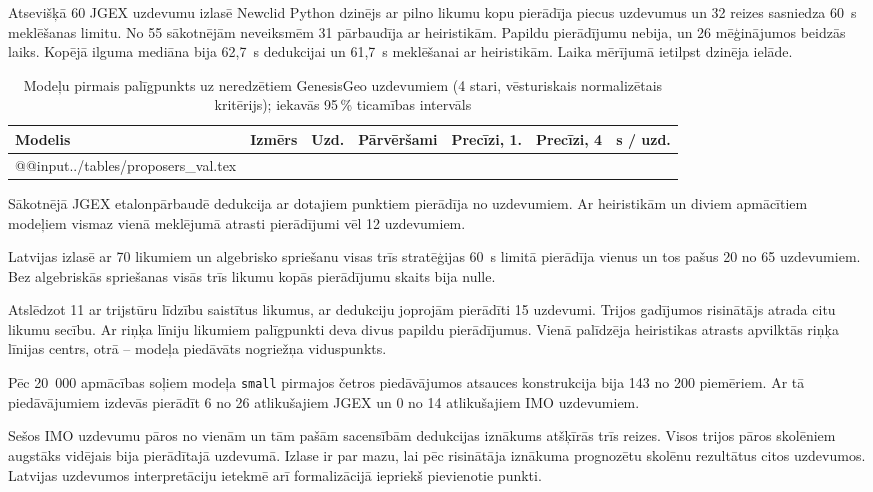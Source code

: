 \documentclass[nolabels]{../template/zpd}
\begin{document}
Atsevišķā 60 JGEX uzdevumu izlasē Newclid Python dzinējs ar pilno likumu kopu pierādīja piecus uzdevumus un 32 reizes sasniedza 60~s meklēšanas limitu. No 55 sākotnējām neveiksmēm 31 pārbaudīja ar heiristikām. Papildu pierādījumu nebija, un 26 mēģinājumos beidzās laiks. Kopējā ilguma mediāna bija 62,7~s dedukcijai un 61,7~s meklēšanai ar heiristikām. Laika mērījumā ietilpst dzinēja ielāde.

\begin{table}[H]
  \caption{Modeļu pirmais palīgpunkts uz neredzētiem GenesisGeo uzdevumiem (4 stari, vēsturiskais normalizētais kritērijs); iekavās 95\,\% ticamības intervāls}\label{tab:proposers}
  \centering\small
  \begin{tabular}{@{}lcccccc@{}}
    \toprule
    Modelis & Izmērs & Uzd. & Pārvēršami & Precīzi, 1. & Precīzi, 4 & s / uzd. \\
    \midrule
    \csname @@input\endcsname ../tables/proposers_val.tex 
    \bottomrule
  \end{tabular}
\end{table}



\begin{secinajumi}
  \item Sākotnējā JGEX etalonpārbaudē dedukcija ar dotajiem punktiem pierādīja \jgexSolved{} no \jgexTotal{} uzdevumiem. Ar heiristikām un diviem apmācītiem modeļiem vismaz vienā meklējumā atrasti pierādījumi vēl 12 uzdevumiem.
  \item Latvijas izlasē ar 70 likumiem un algebrisko spriešanu visas trīs stratēģijas 60~s limitā pierādīja vienus un tos pašus 20 no 65 uzdevumiem. Bez algebriskās spriešanas visās trīs likumu kopās pierādījumu skaits bija nulle.
  \item Atslēdzot 11 ar trijstūru līdzību saistītus likumus, ar dedukciju joprojām pierādīti 15 uzdevumi. Trijos gadījumos risinātājs atrada citu likumu secību. Ar riņķa līniju likumiem palīgpunkti deva divus papildu pierādījumus. Vienā palīdzēja heiristikas atrasts apvilktās riņķa līnijas centrs, otrā – modeļa piedāvāts nogriežņa viduspunkts.
  \item Pēc 20~000 apmācības soļiem modeļa \texttt{small} pirmajos četros piedāvājumos atsauces konstrukcija bija 143 no 200 piemēriem. Ar tā piedāvājumiem izdevās pierādīt 6 no 26 atlikušajiem JGEX un 0 no 14 atlikušajiem IMO uzdevumiem.
  \item Sešos IMO uzdevumu pāros no vienām un tām pašām sacensībām dedukcijas iznākums atšķīrās trīs reizes. Visos trijos pāros skolēniem augstāks vidējais bija pierādītajā uzdevumā. Izlase ir par mazu, lai pēc risinātāja iznākuma prognozētu skolēnu rezultātus citos uzdevumos. Latvijas uzdevumos interpretāciju ietekmē arī formalizācijā iepriekš pievienotie punkti.
\end{secinajumi}
\end{document}
